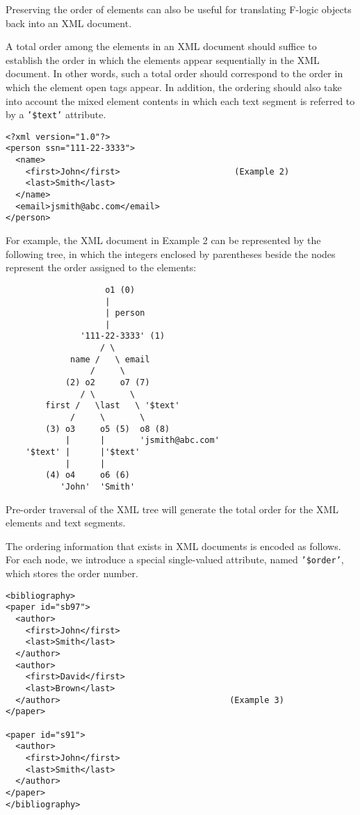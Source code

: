 Preserving the order of elements can also be useful for translating F-logic
objects back into an XML document.

A total order among the elements in an XML document should suffice to
establish the order in which the elements appear sequentially in the
XML document. In other words, such a total order should correspond to
the order in which the element open tags appear. In addition, the
ordering should also take into account the mixed element contents in
which each text segment is referred to by a {\tt '\$text'}  attribute.

\begin{verbatim}
<?xml version="1.0"?>
<person ssn="111-22-3333">
  <name>
    <first>John</first>                       (Example 2)
    <last>Smith</last>
  </name>
  <email>jsmith@abc.com</email>
</person>
\end{verbatim}


For example, the XML document in Example 2 can be represented by the
following tree, in which the integers enclosed by parentheses beside
the nodes represent the order assigned to the elements:

\begin{verbatim}
                    o1 (0)
                    |
                    | person
                    |
               '111-22-3333' (1)
                   / \
             name /   \ email
                 /     \
            (2) o2     o7 (7)
               / \       \ 
        first /   \last   \ '$text'
             /     \       \
        (3) o3     o5 (5)  o8 (8)
            |      |       'jsmith@abc.com'
    '$text' |      |'$text'
            |      |
        (4) o4     o6 (6)
           'John'  'Smith'
\end{verbatim}

Pre-order traversal of the XML tree will generate the total order for
the XML elements and text segments.

The ordering information that exists in XML documents is encoded as
follows. For each node, we introduce a special single-valued attribute,
named {\tt '\$order'}, which stores the order number.

\begin{verbatim}
<bibliography>
<paper id="sb97">
  <author>
    <first>John</first>
    <last>Smith</last>
  </author>
  <author>
    <first>David</first>
    <last>Brown</last>
  </author>                                  (Example 3)
</paper>

<paper id="s91">
  <author>
    <first>John</first>
    <last>Smith</last>
  </author>
</paper>
</bibliography>
\end{verbatim}


